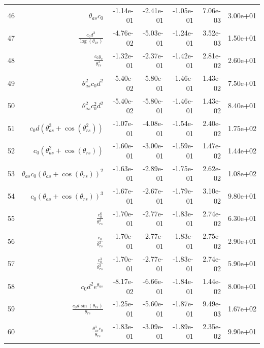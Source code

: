 \begin{tabularx}{\textwidth}{lRRRRRl}
46  &  $ \theta_{as} c_{0} $  &  -1.14e-01  &  -2.41e-01  &  -1.05e-01  &  7.06e-03  &  3.00e+01  \\ 
47  &  $ \displaystyle\frac{c_{0} d^{2}}{\log{\left(\theta_{as} \right)}} $  &  -4.76e-02  &  -5.03e-01  &  -1.24e-01  &  3.52e-03  &  1.50e+01  \\ 
48  &  $ \displaystyle\frac{c_{0} y_c}{\theta_{rs}^{3}} $  &  -1.32e-01  &  -2.37e-01  &  -1.42e-01  &  2.81e-02  &  2.60e+01  \\ 
49  &  $ \theta_{as}^{2} c_{0} d^{2} $  &  -5.40e-02  &  -5.80e-01  &  -1.46e-01  &  1.43e-02  &  7.50e+01  \\ 
50  &  $ \theta_{as}^{2} c_{0}^{2} d^{2} $  &  -5.40e-02  &  -5.80e-01  &  -1.46e-01  &  1.43e-02  &  8.40e+01  \\ 
51  &  $ c_{0} d \left(\theta_{as}^{3} + \cos{\left(\theta_{rs}^{2} \right)}\right) $  &  -1.07e-01  &  -4.08e-01  &  -1.54e-01  &  2.40e-02  &  1.75e+02  \\ 
52  &  $ c_{0} \left(\theta_{as}^{2} + \cos{\left(\theta_{rs} \right)}\right) $  &  -1.60e-01  &  -3.00e-01  &  -1.59e-01  &  1.47e-02  &  1.44e+02  \\ 
53  &  $ \theta_{as} c_{0} \left(\theta_{as} + \cos{\left(\theta_{rs} \right)}\right)^{2} $  &  -1.63e-01  &  -2.89e-01  &  -1.75e-01  &  2.62e-02  &  1.08e+02  \\ 
54  &  $ c_{0} \left(\theta_{as} + \cos{\left(\theta_{rs} \right)}\right)^{3} $  &  -1.67e-01  &  -2.67e-01  &  -1.79e-01  &  3.10e-02  &  9.80e+01  \\ 
55  &  $ \displaystyle\frac{c_{0}^{6}}{\theta_{rs}^{3}} $  &  -1.70e-01  &  -2.77e-01  &  -1.83e-01  &  2.74e-02  &  6.30e+01  \\ 
56  &  $ \displaystyle\frac{c_{0}}{\theta_{rs}^{3}} $  &  -1.70e-01  &  -2.77e-01  &  -1.83e-01  &  2.75e-02  &  2.90e+01  \\ 
57  &  $ \displaystyle\frac{c_{0}^{3}}{\theta_{rs}^{3}} $  &  -1.70e-01  &  -2.77e-01  &  -1.83e-01  &  2.74e-02  &  5.90e+01  \\ 
58  &  $ c_{0} d^{2} e^{\theta_{as}} $  &  -8.17e-02  &  -6.66e-01  &  -1.84e-01  &  1.44e-02  &  8.00e+01  \\ 
59  &  $ \displaystyle\frac{c_{0} d \sin{\left(\theta_{rs} \right)}}{\theta_{rs}} $  &  -1.25e-01  &  -5.60e-01  &  -1.87e-01  &  9.49e-03  &  1.67e+02  \\ 
60  &  $ \displaystyle\frac{\theta_{as}^{3} c_{0}}{\theta_{rs}} $  &  -1.83e-01  &  -3.09e-01  &  -1.89e-01  &  2.35e-02  &  9.90e+01  \\ 

\end{tabularx}
